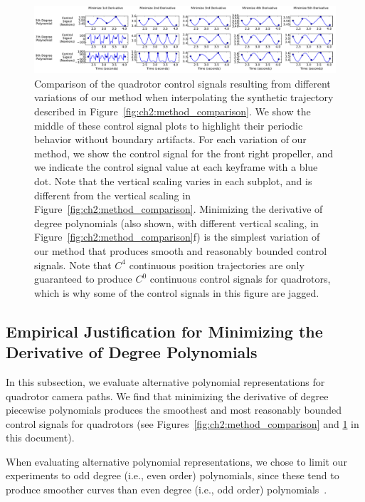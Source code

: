 \begin{figure}[t!]
\centering
\includegraphics[width=6.0in]{images/2015_siggraph_asia_supplementary/parameter_comparison}
\caption{
Comparison of the quadrotor control signals resulting from different variations of our method when interpolating the synthetic trajectory described in Figure~\ref{fig:ch2:method_comparison}.
We show the middle of these control signal plots to highlight their periodic behavior without boundary artifacts.
For each variation of our method, we show the control signal for the front right propeller, and we indicate the control signal value at each keyframe with a blue dot. Note that the vertical scaling varies in each subplot, and is different from the vertical scaling in Figure~\ref{fig:ch2:method_comparison}.
Minimizing the  derivative of  degree polynomials (also shown, with different vertical scaling, in Figure~\ref{fig:ch2:method_comparison}f) is the simplest variation of our method that produces smooth and reasonably bounded control signals.
Note that  $C^4$ continuous position trajectories are only guaranteed to produce $C^0$ continuous control signals for quadrotors, which is why some of the control signals in this figure are jagged.
}
\label{fig:ch2:parameter_comparison}
\end{figure}

\subsection{Empirical Justification for Minimizing the  Derivative of  Degree Polynomials}
\label{sec:ch2:derivative_experiment}

In this subsection, we evaluate alternative polynomial representations for quadrotor camera paths.
We find that minimizing the  derivative of  degree piecewise polynomials produces the smoothest and most reasonably bounded control signals for quadrotors (see Figures~\ref{fig:ch2:method_comparison} and \ref{fig:ch2:parameter_comparison} in this document).

When evaluating alternative polynomial representations, we chose to limit our experiments to odd degree (i.e., even order) polynomials, since these tend to produce smoother curves than even degree (i.e., odd order) polynomials~\cite{goshtasby:1990}.


